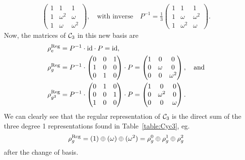 {\begin{example}
\begin{align*}
\begin{pmatrix}
				1&1&1 \\
				1&\omega^2&\omega \\
				1&\omega&\omega^2
			\end{pmatrix}, \quad \text{with inverse} \quad P^{-1} = \frac{1}{3}\begin{pmatrix}
				1&1&1 \\
				1&\omega&\omega^2 \\
				1&\omega^2&\omega
			\end{pmatrix}.
		\end{align*}
		Now, the matrices of $\mathcal{C}_3$ in this new basis are
		\begin{align*}
			\rho_e^{\text{Reg}} &= P^{-1} \cdot \text{id} \cdot P = \text{id}, \\ 
			\rho_g^{\text{Reg}} &= P^{-1}\cdot\begin{pmatrix}
				0&0&1 \\ 1&0&0 \\ 0&1&0
			\end{pmatrix}\cdot P = \begin{pmatrix}
			1&0&0 \\ 0&\omega&0 \\ 0&0&\omega^2
			\end{pmatrix}, \quad \text{and} \\
			\rho_{g^2}^{\text{Reg}} &= P^{-1}\cdot\begin{pmatrix}
				0&1&0 \\ 0&0&1 \\ 1&0&0 
			\end{pmatrix}\cdot P = \begin{pmatrix}
			1&0&0 \\ 0&\omega^2&0 \\ 0&0&\omega
			\end{pmatrix}.
		\end{align*}
		We can clearly see that the regular representation of $\mathcal{C}_3$ is the direct sum of the three degree 1 representations found in Table~\ref{table:Cyc3}, eg. 
		\begin{align*}
			\rho_g^{\text{Reg}} = (1) \oplus (\omega) \oplus (\omega^2) = \rho^0_g \oplus \rho^1_g \oplus \rho^2_g
		\end{align*}
		after the change of basis.
	\end{example}}
	
